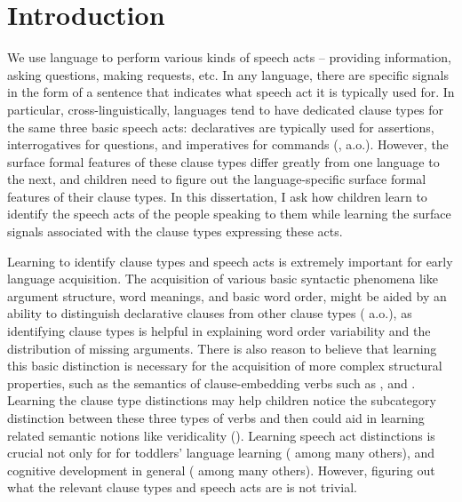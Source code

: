 \chapter{Introduction}
\label{chap:introduction}

We use language to perform various kinds of speech acts -- providing information, asking questions, making requests, etc. In any language, there are specific signals in the form of a sentence that indicates what speech act it is typically used for. In particular, cross-linguistically, languages tend to have dedicated clause types for the same three basic speech acts: declaratives are typically used for assertions, interrogatives for questions, and imperatives for commands (\citealt{sz1985speechact, konig2007, aikhenvald2016, portner2018}, a.o.). However, the surface formal features of these clause types differ greatly from one language to the next, and children need to figure out the language-specific surface formal features of their clause types. In this dissertation, I ask how children learn to identify the speech acts of the people speaking to them while learning the surface signals associated with the clause types expressing these acts. 


Learning to identify clause types and speech acts is extremely important for early language acquisition. The acquisition of various basic syntactic phenomena like argument structure, word meanings, and basic word order, might be aided by an ability to distinguish declarative clauses from other clause types (\citealt{pinker1984, pinker1989, gleitman1990, frankgoldwaterfrank2013, perkins2019} a.o.), as identifying clause types is helpful in explaining word order variability and the distribution of missing arguments. There is also reason to believe that learning this basic distinction is necessary for the acquisition of more complex structural properties, such as the semantics of clause-embedding verbs such as ,  and . Learning the clause type distinctions may help children notice the subcategory distinction between these three types of verbs and then could aid in learning related semantic notions like veridicality (\citealt{white2015diss, lewis2017think,dudley2017,hacquardlidz2018}). 
Learning speech act distinctions is crucial not only for for toddlers' language learning (\citealt{ninio1980, hoff1985cds,yoder1994,rowland2003cdswh, valian2003cds, rowe2017wh, gaudreau2021question} among many others), and cognitive development in general (\citealt{hohmann1995educating} among many others). However, figuring out what the relevant clause types and speech acts are is not trivial. 




